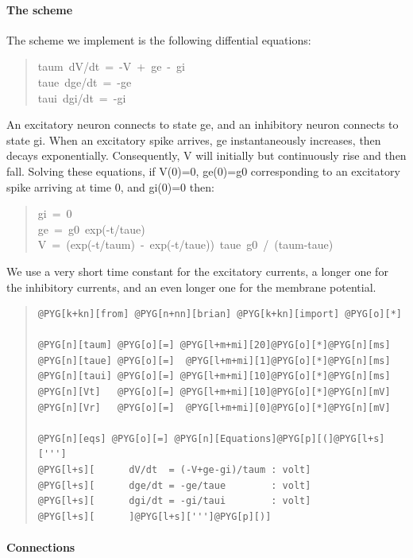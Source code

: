 \documentclass[letterpaper,10pt,english]{manual}
\begin{document}
\paragraph{The scheme}

The scheme we implement is the following diffential equations:
\begin{quote}
{\raggedright{}taum~dV/dt~=~-V~+~ge~-~gi\\
taue~dge/dt~=~-ge\\
taui~dgi/dt~=~-gi}
\end{quote}

An excitatory neuron connects to state ge, and an inhibitory neuron connects
to state gi. When an excitatory spike arrives, ge instantaneously increases,
then decays exponentially. Consequently, V will initially but continuously
rise and then fall. Solving these equations, if V(0)=0, ge(0)=g0 corresponding
to an excitatory spike arriving at time 0, and gi(0)=0 then:
\begin{quote}
{\raggedright{}gi~=~0\\
ge~=~g0~exp(-t/taue)\\
V~=~(exp(-t/taum)~-~exp(-t/taue))~taue~g0~/~(taum-taue)}
\end{quote}

We use a very short time constant for the excitatory currents, a longer one
for the inhibitory currents, and an even longer one for the membrane
potential.
\begin{quote}

\begin{Verbatim}[commandchars=@\[\]]
@PYG[k+kn][from] @PYG[n+nn][brian] @PYG[k+kn][import] @PYG[o][*]

@PYG[n][taum] @PYG[o][=] @PYG[l+m+mi][20]@PYG[o][*]@PYG[n][ms]
@PYG[n][taue] @PYG[o][=]  @PYG[l+m+mi][1]@PYG[o][*]@PYG[n][ms]
@PYG[n][taui] @PYG[o][=] @PYG[l+m+mi][10]@PYG[o][*]@PYG[n][ms]
@PYG[n][Vt]   @PYG[o][=] @PYG[l+m+mi][10]@PYG[o][*]@PYG[n][mV]
@PYG[n][Vr]   @PYG[o][=]  @PYG[l+m+mi][0]@PYG[o][*]@PYG[n][mV]

@PYG[n][eqs] @PYG[o][=] @PYG[n][Equations]@PYG[p][(]@PYG[l+s][''']
@PYG[l+s][      dV/dt  = (-V+ge-gi)/taum : volt]
@PYG[l+s][      dge/dt = -ge/taue        : volt]
@PYG[l+s][      dgi/dt = -gi/taui        : volt]
@PYG[l+s][      ]@PYG[l+s][''']@PYG[p][)]
\end{Verbatim}
\end{quote}


\paragraph{Connections}
\end{document}

